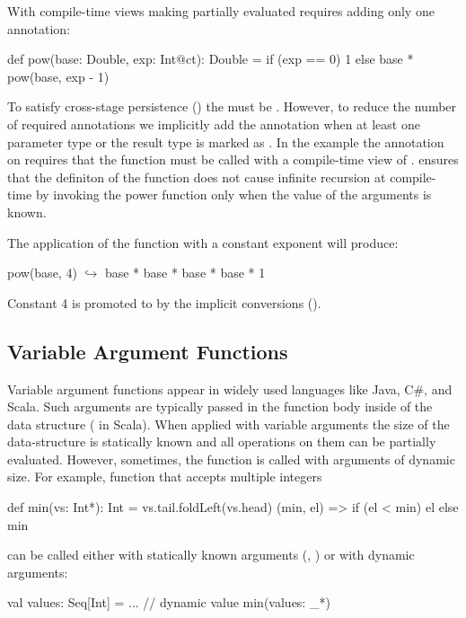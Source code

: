 With compile-time views making  partially evaluated requires adding only one annotation:

\begin{lstparagraph}
def pow(base: Double, exp: Int@ct): Double =
  if (exp == 0) 1 else base * pow(base, exp - 1)
\end{lstparagraph}

To satisfy cross-stage persistence () the  must be .
However, to reduce the number of required annotations we implicitly add the  annotation
when at least one parameter type or the result type is marked as . In the example
 the  annotation on  requires that the function must be called with
 a compile-time view of . \tool ensures that the definiton of the  function
 does not cause infinite recursion at compile-time by invoking the power function
 only when the value of the  arguments is known.

 The application of the function  with a constant
 exponent will produce:

\begin{lstparagraph}
pow(base, 4)
  $\hookrightarrow$ base * base * base * base * 1
\end{lstparagraph}

Constant 4 is promoted to  by the implicit conversions ().

\subsection{Variable Argument Functions}
\label{sct:varargs}

Variable argument functions appear in widely used languages like Java, C\#, and Scala.
 Such arguments are typically passed in the function body inside of the data structure
 (\eg {} in Scala). When applied with variable arguments the size of the
 data-structure is statically known and all operations on them can be partially
 evaluated. However, sometimes, the function is called with arguments of dynamic size.
 For example, function  that accepts multiple integers\begin{lstparagraph}
def min(vs: Int*): Int = vs.tail.foldLeft(vs.head) {
  (min, el) => if (el < min) el else min
}
\end{lstparagraph}can be called either with statically known arguments
 (\eg, ) or with dynamic arguments:\begin{lstparagraph}
val values: Seq[Int] = ... // dynamic value
min(values: _*)
\end{lstparagraph}


